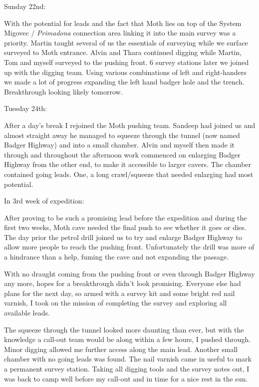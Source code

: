 Sunday 22nd:

With the potential for leads and the fact that Moth lies on top of the
System Migovec / \emph{Primadona} connection area linking it into the
main survey was a priority. Martin taught several of us the essentials
of surveying while we surface surveyed to Moth entrance. Alvin and Thara
continued digging while Martin, Tom and myself surveyed to the pushing
front. 6 survey stations later we joined up with the digging team. Using
various combinations of left and right-handers we made a lot of progress
expanding the left hand badger hole and the trench. Breakthrough looking
likely tomorrow.

Tuesday 24th:

After a day's break I rejoined the Moth pushing team. Sandeep had joined
us and almost straight away he managed to squeeze through the tunnel
(now named Badger Highway) and into a small chamber. Alvin and myself
then made it through and throughout the afternoon work commenced on
enlarging Badger Highway from the other end, to make it accessible to
larger cavers. The chamber contained going leads. One, a long
crawl/squeeze that needed enlarging had most potential.

In 3rd week of expedition:

After proving to be such a promising lead before the expedition and
during the first two weeks, Moth cave needed the final push to see
whether it goes or dies. The day prior the petrol drill joined us to try
and enlarge Badger Highway to allow more people to reach the pushing
front. Unfortunately the drill was more of a hindrance than a help,
fuming the cave and not expanding the passage.

With no draught coming from the pushing front or even through Badger
Highway any more, hopes for a breakthrough didn't look promising.
Everyone else had plans for the next day, so armed with a survey kit and
some bright red nail varnish, I took on the mission of completing the
survey and exploring all available leads.

The squeeze through the tunnel looked more daunting than ever, but with
the knowledge a call-out team would be along within a few hours, I
pushed through. Minor digging allowed me further access along the main
lead. Another small chamber with no going leads was found. The nail
varnish came in useful to mark a permanent survey station. Taking all
digging tools and the survey notes out, I was back to camp well before
my call-out and in time for a nice rest in the sun.

